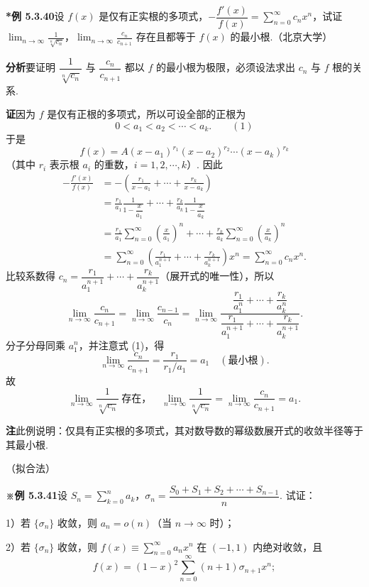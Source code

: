 \documentclass[UTF8,12pt,a4paper,fontset=fandol]{ctexart}
\begin{document}
\noindent\textbf{*例 5.3.40}\quad 设 $f(x)$ 是仅有正实根的多项式，$-\dfrac{f'(x)}{f(x)}=\displaystyle\sum_{n=0}^{\infty}c_nx^n$，试证 $\displaystyle\lim_{n\to\infty}\frac1{\sqrt[n]{c_n}}$，$\displaystyle\lim_{n\to\infty}\frac{c_n}{c_{n+1}}$ 存在且都等于 $f(x)$ 的最小根.（北京大学）

\noindent\textbf{分析}\quad 要证明 $\dfrac1{\sqrt[n]{c_n}}$ 与 $\dfrac{c_n}{c_{n+1}}$ 都以 $f$ 的最小根为极限，必须设法求出 $c_n$ 与 $f$ 根的关系.

\noindent\textbf{证}\quad 因为 $f$ 是仅有正根的多项式，所以可设全部的正根为
\[
  0<a_1<a_2<\cdots<a_k. \qquad(1)
\]
于是
\[
  f(x)=A(x-a_1)^{r_1}(x-a_2)^{r_2}\cdots(x-a_k)^{r_k}
\]
（其中 $r_i$ 表示根 $a_i$ 的重数，$i=1,2,\cdots,k$）. 因此
\[
\begin{aligned}
-\frac{f'(x)}{f(x)}
&=-\left(\frac{r_1}{x-a_1}+\cdots+\frac{r_k}{x-a_k}\right)\\
&=\frac{r_1}{a_1}\frac1{1-\dfrac{x}{a_1}}+\cdots+
\frac{r_k}{a_k}\frac1{1-\dfrac{x}{a_k}}\\
&=\frac{r_1}{a_1}\sum_{n=0}^{\infty}\left(\frac{x}{a_1}\right)^n+\cdots+
\frac{r_k}{a_k}\sum_{n=0}^{\infty}\left(\frac{x}{a_k}\right)^n\\
&=\sum_{n=0}^{\infty}\left(\frac{r_1}{a_1^{n+1}}+\cdots+\frac{r_k}{a_k^{n+1}}\right)x^n
=\sum_{n=0}^{\infty}c_nx^n.
\end{aligned}
\]
比较系数得 $c_n=\dfrac{r_1}{a_1^{n+1}}+\cdots+\dfrac{r_k}{a_k^{n+1}}$（展开式的唯一性），所以
\[
  \lim_{n\to\infty}\frac{c_n}{c_{n+1}}
  =\lim_{n\to\infty}\frac{c_{n-1}}{c_n}
  =\lim_{n\to\infty}
  \frac{\dfrac{r_1}{a_1^n}+\cdots+\dfrac{r_k}{a_k^n}}
       {\dfrac{r_1}{a_1^{n+1}}+\cdots+\dfrac{r_k}{a_k^{n+1}}}.
\]
分子分母同乘 $a_1^n$，并注意式 (1)，得
\[
  \lim_{n\to\infty}\frac{c_n}{c_{n+1}}
  =\frac{r_1}{r_1/a_1}=a_1\quad(\text{最小根}).
\]
故
\[
  \lim_{n\to\infty}\frac1{\sqrt[n]{c_n}}
  \ \text{存在，}\quad
  \lim_{n\to\infty}\frac1{\sqrt[n]{c_n}}
  =\lim_{n\to\infty}\frac{c_n}{c_{n+1}}=a_1.
\]

\noindent\textbf{注}\quad 此例说明：仅具有正实根的多项式，其对数导数的幂级数展开式的收敛半径等于其最小根.

（拟合法）

\noindent\textbf{※例 5.3.41}\quad 设 $S_n=\displaystyle\sum_{k=0}^n a_k$，$\sigma_n=\dfrac{S_0+S_1+S_2+\cdots+S_{n-1}}{n}$. 试证：

1）若 $\{\sigma_n\}$ 收敛，则 $a_n=o(n)$（当 $n\to\infty$ 时）；

2）若 $\{\sigma_n\}$ 收敛，则 $f(x)\equiv\displaystyle\sum_{n=0}^{\infty}a_nx^n$ 在 $(-1,1)$ 内绝对收敛，且
\[
  f(x)=(1-x)^2\sum_{n=0}^{\infty}(n+1)\sigma_{n+1}x^n;
\]
\end{document}
